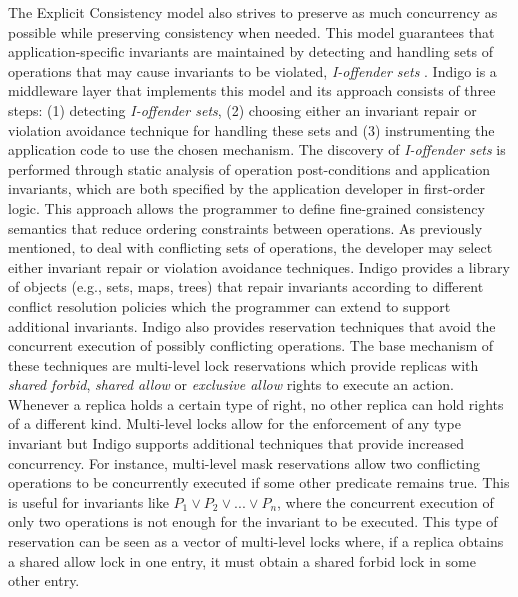 The Explicit Consistency model also strives to preserve as much concurrency as possible while preserving consistency when needed. This model guarantees that application-specific invariants are maintained by detecting and handling sets of operations that may cause invariants to be violated, \textit{I-offender sets} \cite{Balegas2015}. Indigo is a middleware layer that implements this model and its approach consists of three steps: (1) detecting \textit{I-offender sets}, (2) choosing either an invariant repair or violation avoidance technique for handling these sets and (3) instrumenting the application code to use the chosen mechanism. The discovery of \textit{I-offender sets} is performed through static analysis of operation post-conditions and application invariants, which are both specified by the application developer in first-order logic. This approach allows the programmer to define fine-grained consistency semantics that reduce ordering constraints between operations. As previously mentioned, to deal with conflicting sets of operations, the developer may select either invariant repair or violation avoidance techniques. Indigo provides a library of objects (e.g., sets, maps, trees) that repair invariants according to different conflict resolution policies which the programmer can extend to support additional invariants. Indigo also provides reservation techniques that avoid the concurrent execution of possibly conflicting operations. The base mechanism of these techniques are multi-level lock reservations which provide replicas with \textit{shared forbid}, \textit{shared allow} or \textit{exclusive allow} rights to execute an action. Whenever a replica holds a certain type of right, no other replica can hold rights of a different kind. Multi-level locks allow for the enforcement of any type invariant but Indigo supports additional techniques that provide increased concurrency. For instance, multi-level mask reservations allow two conflicting operations to be concurrently executed if some other predicate remains true. This is useful for invariants like $P_1 \vee P_2 \vee ... \vee P_n$, where the concurrent execution of only two operations is not enough for the invariant to be executed. This type of reservation can be seen as a vector of multi-level locks where, if a replica obtains a shared allow lock in one entry, it must obtain a shared forbid lock in some other entry. 

